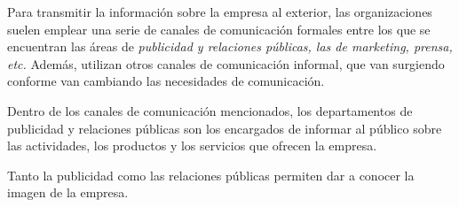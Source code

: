 Para transmitir la información sobre la empresa al exterior, las 
organizaciones suelen emplear una serie de canales de comunicación formales
entre los que se encuentran las áreas de \textit{publicidad  y relaciones públicas,
las de marketing, prensa, etc.} Además, utilizan otros canales de comunicación informal,
que van surgiendo conforme van cambiando las necesidades de comunicación.

Dentro de los canales de comunicación mencionados, los departamentos de publicidad
y relaciones públicas son los encargados de informar al público sobre las actividades,
los productos y los servicios que ofrecen la empresa.

Tanto la publicidad como las relaciones públicas permiten dar a conocer la imagen de la empresa.

